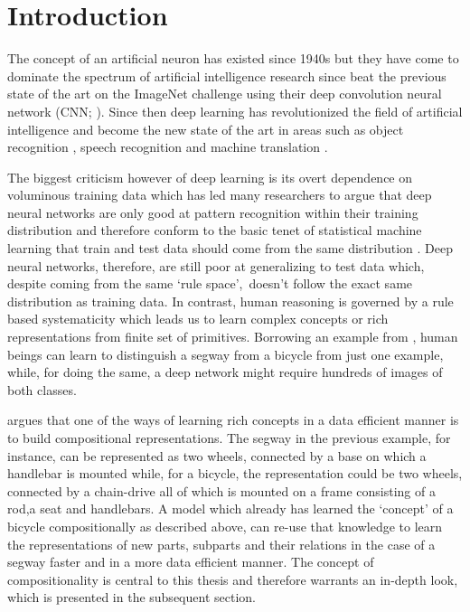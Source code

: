\chapter{Introduction}\label{Chpater:intro}
	
The concept of an artificial neuron has existed since 1940s \citep{McCulloch1943} but they have come to dominate the spectrum of artificial intelligence research since \cite{Krizhevsky2012} beat the previous state of the art on the ImageNet challenge \citep{Deng2009} using their deep convolution neural network (CNN; \citep{Lecun89}). Since then deep learning has revolutionized the field of artificial intelligence and become the new state of the art in areas such as object recognition \citep{He2015}, speech recognition \citep{Graves2013} and machine translation \citep{Sutskever2014}.

The biggest criticism however of deep learning is its overt dependence on voluminous training data which has led many researchers to argue that deep neural networks are only good at pattern recognition within their training distribution \citep{Marcus2018} and therefore conform to the basic tenet of statistical machine learning that train and test data should come from the same distribution \citep{Zadrozny:2004:LEC:1015330.1015425}. Deep neural networks, therefore, are still poor at generalizing to test data which, despite coming from the same \lq rule space{}\rq,\ doesn't follow the exact same distribution as training data. In contrast, human reasoning is governed by a rule based systematicity \citep{FODOR19883} which leads us to learn complex concepts or rich representations from finite set of primitives. Borrowing an example from \cite{Lake2016}, human beings can learn to distinguish a segway from a bicycle from just one example, while, for doing the same, a deep network might require hundreds of images of both classes. 

\cite{Lake2016} argues that one of the ways of learning rich concepts in a data efficient manner is to build compositional representations. The segway in the previous example, for instance, can be represented as two wheels, connected by a base on which a handlebar is mounted while, for a bicycle, the representation could be two wheels, connected by a chain-drive all of which is mounted on a frame consisting of a rod,a seat and handlebars. A model which already has learned the \lq concept\rq{} of a bicycle compositionally as described above, can re-use that knowledge to learn the representations of new parts, subparts and their relations in the case of a segway faster and in a more data efficient manner. The concept of compositionality is central to this thesis and therefore warrants an in-depth look, which is presented in the subsequent section.

